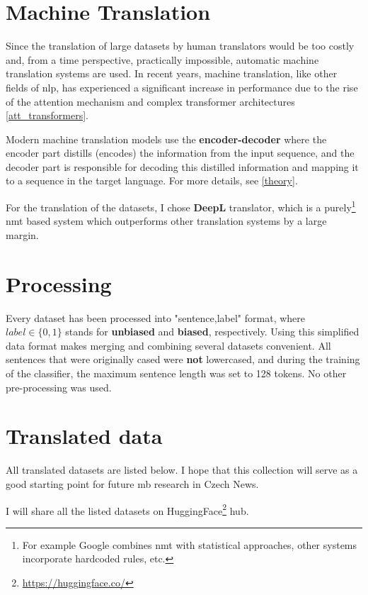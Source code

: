  
 
 
 
\section{Machine Translation}\label{DeepL}
Since the translation of large datasets by human translators would be too costly and, from a time perspective, practically impossible, automatic machine translation systems are used. In recent years, machine translation, like other fields of \Gls{nlp}, has experienced a significant increase in performance due to the rise of the attention mechanism and complex transformer architectures \ref{att_transformers}.

Modern machine translation models use the \textbf{encoder-decoder} where the encoder part distills (encodes) the information from the input sequence, and the decoder part is responsible for decoding this distilled information and mapping it to a sequence in the target language. For more details, see \ref{theory}.

For the translation of the datasets, I chose \textbf{DeepL} translator, which is a purely\footnote{For example Google combines \Gls{nmt} with statistical approaches, other systems incorporate hardcoded rules, etc.} \Gls{nmt} based system which outperforms other translation systems by a large margin.






\section{Processing}\label{processing}
Every dataset has been processed into "sentence,label" format, where $label \in \{0,1\}$ stands for \textbf{unbiased} and \textbf{biased}, respectively. Using this simplified data format makes merging and combining several datasets convenient. All sentences that were originally cased were \textbf{not} lowercased, and during the training of the classifier, the maximum sentence length was set to 128 tokens. No other pre-processing was used.

\section{Translated data}
All translated datasets are listed below. I hope that this collection will serve as a good starting point for future \gls{mb} research in Czech News.

I will share all the listed datasets on HuggingFace\footnote{\url{https://huggingface.co/}} hub.

